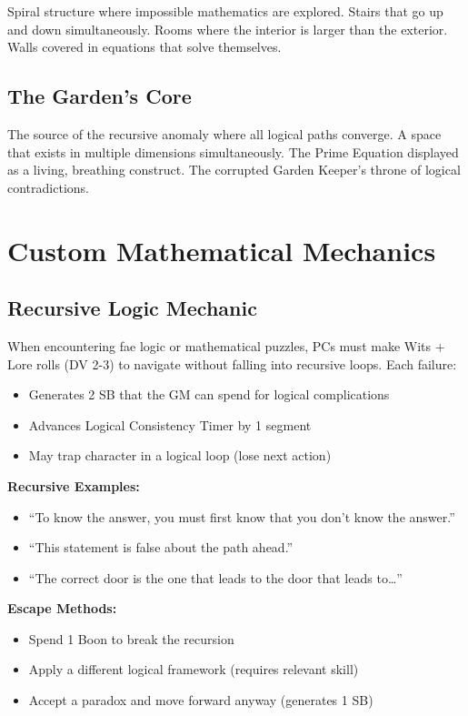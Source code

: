\documentclass[11pt]{article}
\begin{document}
Spiral structure where impossible mathematics are explored. Stairs that go up and down simultaneously. Rooms where the interior is larger than the exterior. Walls covered in equations that solve themselves.

\subsection{The Garden's Core}

The source of the recursive anomaly where all logical paths converge. A space that exists in multiple dimensions simultaneously. The Prime Equation displayed as a living, breathing construct. The corrupted Garden Keeper's throne of logical contradictions.

\section{Custom Mathematical Mechanics}

\subsection{Recursive Logic Mechanic}

When encountering fae logic or mathematical puzzles, PCs must make Wits + Lore rolls (DV 2-3) to navigate without falling into recursive loops. Each failure:
\begin{itemize}
\item Generates 2 SB that the GM can spend for logical complications
\item Advances Logical Consistency Timer by 1 segment
\item May trap character in a logical loop (lose next action)
\end{itemize}

\textbf{Recursive Examples:}
\begin{itemize}
\item ``To know the answer, you must first know that you don't know the answer.''
\item ``This statement is false about the path ahead.''
\item ``The correct door is the one that leads to the door that leads to\dots''
\end{itemize}

\textbf{Escape Methods:}
\begin{itemize}
\item Spend 1 Boon to break the recursion
\item Apply a different logical framework (requires relevant skill)
\item Accept a paradox and move forward anyway (generates 1 SB)
\end{itemize}
\end{document}
